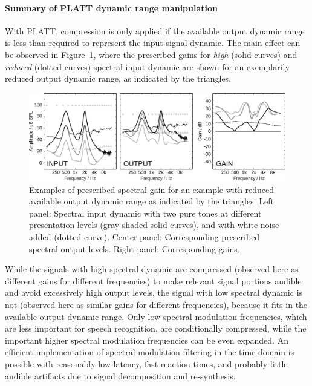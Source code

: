 \documentclass[10pt,a4paper,twocolumn]{article}
\begin{document}
\paragraph{Summary of PLATT dynamic range manipulation}
%
With PLATT, compression is only applied if the available output dynamic range is less than required to represent the input signal dynamic.
%
The main effect can be observed in Figure~\ref{fig:9}, where the prescribed gains for \emph{high} (solid curves) and \emph{reduced} (dotted curves) spectral input dynamic are shown for an exemplarily reduced output dynamic range, as indicated by the triangles.
%
\begin{figure}[h]
	\centerline{\includegraphics[width=.8\textwidth]{images/details-dynamic}}
	\caption{Examples of prescribed spectral gain for an example with reduced available output dynamic range as indicated by the triangles.
		Left panel: Spectral input dynamic with two pure tones at different presentation levels (gray shaded solid curves), and with white noise added (dotted curve).
		Center panel: Corresponding prescribed spectral output levels.
		Right panel: Corresponding gains.}
	\label{fig:9}
\end{figure} 
%
While the signals with high spectral dynamic are compressed (observed here as different gains for different frequencies) to make relevant signal portions audible and avoid excessively high output levels, the signal with low spectral dynamic is not (observed here as similar gains for different frequencies), because it fits in the available output dynamic range.
%
Only low spectral modulation frequencies, which are less important for speech recognition, are conditionally compressed, while the important higher spectral modulation frequencies can be even expanded.
%
An efficient implementation of spectral modulation filtering in the time-domain is possible with reasonably low latency, fast reaction times, and probably little audible artifacts due to signal decomposition and re-synthesis.
\end{document}
